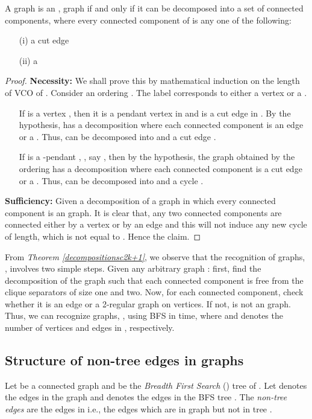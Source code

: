 \documentclass[runningheads]{llncs}
\begin{document}
\begin{theorem}
\label{decompositionsc2k+1}
A graph  is an , graph if and only if it can be decomposed into a set of connected components, where every connected component of  is any one of the following:
\begin{itemize}
\item[(i)] a cut edge
\item[(ii)] a 
\end{itemize}
\end{theorem}
\begin{proof}
\textbf{Necessity:}  We shall prove this by mathematical induction on the length  of VCO of .
\noindent Consider an ordering . The label  corresponds to either a vertex or a . 
\begin{itemize}
\item[] 
If  is a vertex , then it is a pendant vertex in  and  is a cut edge  in . By the hypothesis,  has a decomposition  where each connected component is an edge or a . Thus,  can be decomposed into  and a cut edge .

\item[] 
If  is a -pendant , , say , then by the hypothesis, the graph obtained by the ordering  has a decomposition  where each connected component is a cut edge or a . Thus,  can be decomposed into  and a cycle .

\end{itemize}

\noindent \textbf{Sufficiency:} Given a decomposition of a graph in which every connected component is an  graph. It is clear that, any two connected components are connected either by a vertex or by an edge and this will not induce any new cycle of length, which is not equal to . Hence the claim. 
\end{proof}



\noindent From \emph{Theorem \ref{decompositionsc2k+1}}, we observe that the recognition of  graphs, , involves two simple steps. Given any arbitrary graph : first, find the decomposition of the graph  such that each connected component is free from the clique separators of size one and two. Now, for each connected component, check whether it is an edge or a 2-regular graph on  vertices. If not,  is not an  graph. Thus, we can recognize  graphs, , using BFS in  time, where  and  denotes the number of vertices and edges in , respectively.

\subsection{Structure of non-tree edges in  graphs}
\begin{definition}
Let  be a connected graph and  be the \emph{Breadth First Search} () tree of . Let  denotes the edges in the graph  and  denotes the edges in the BFS tree . The \emph{non-tree edges} are the edges in  i.e., the edges which are in graph  but not in tree .  
\end{definition}
\end{document}
